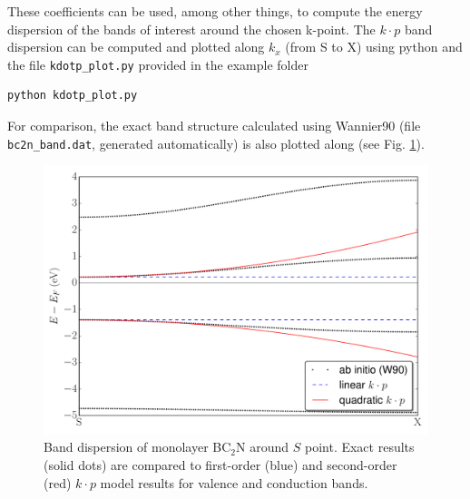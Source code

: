\documentclass[a4paper,11pt,twoside]{article}
\begin{document}
\begin{itemize}
These coefficients can be used, among other things, to compute the energy dispersion of
the bands of interest around the chosen k-point. 
The $k\cdot p$ band dispersion can be computed and plotted along $k_x$ (from S to X)
using python and the file \verb|kdotp_plot.py| provided in the example folder
\begin{verbatim}
python kdotp_plot.py
\end{verbatim}
For comparison, the exact band structure calculated using Wannier90 (file \verb|bc2n_band.dat|, generated automatically) 
is also plotted along (see Fig. \ref{fig:bc2n-bnd}).


\begin{figure}[h]
\begin{center}
\includegraphics[width=12cm]{kdotp_bands_SX.pdf}
\caption{Band dispersion of monolayer BC$_{2}$N around $S$ point. Exact results (solid dots)
are compared to first-order (blue) and second-order (red) $k\cdot p$ model results for valence and conduction bands.} 
\label{fig:bc2n-bnd}
\end{center}
\end{figure}

\end{itemize}
\end{document}

